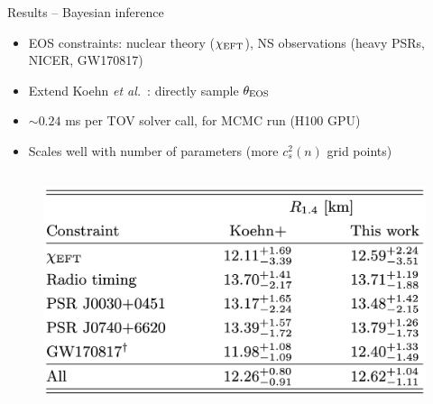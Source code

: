 \documentclass[usenames,dvipsnames,t]{beamer}
\begin{document}
\begin{frame}{Results -- Bayesian inference}

  \def\x{2mm}
  \def\y{2mm}

  \begin{itemize}
    \item EOS constraints: nuclear theory ($\chi_{\rm{EFT}}$), NS observations (heavy PSRs, NICER, GW170817)

    \vspace{\y}

    \item Extend Koehn \textit{et al.}~\cite{Koehn:2024set}: directly sample $\theta_{\rm{EOS}}$

    \vspace{\y}

    \item $\sim 0.24$ ms per TOV solver call,  for MCMC run (H100 GPU)

    \vspace{\y}

    \item Scales well with number of parameters (more $c_s^2(n)$ grid points)
  \end{itemize}


  \begin{columns}


    \begin{figure}[htpb]
      \centering
      \includegraphics[width=0.975\linewidth]{Figures/R14_table.jpg}
    \end{figure}


\end{columns}
\end{frame}
\end{document}
